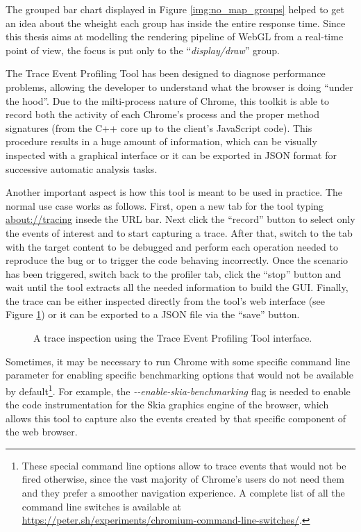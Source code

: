 The grouped bar chart displayed in Figure \ref{img:no_map_groups} helped to
get an idea about the wheight each group has inside the entire response time.
Since this thesis aims at modelling the rendering pipeline of WebGL from a real-time
point of view, the focus is put only to the ``\emph{display/draw}'' group.

The Trace Event Profiling Tool has been designed to diagnose performance problems,
allowing the developer to understand what the browser is doing ``under the hood''.
Due to the milti-process nature of Chrome, this toolkit is able to record
both the activity of each Chrome's process and the proper method signatures
(from the C++ core up to the client's JavaScript code). This procedure results in
a huge amount of information, which can be visually inspected with a graphical
interface or it can be exported in JSON format for successive automatic analysis
tasks.

Another important aspect is how this tool is meant to be used in practice. The normal use case
works as follows. First, open a new tab for the tool typing \url{about://tracing}
insede the URL bar.
Next click the ``record'' button to select only the events of interest and to
start capturing a trace. After that, switch to the tab with the target content
to be debugged and perform each operation needed to reproduce the bug or to trigger
the code behaving incorrectly. Once the scenario has been triggered, switch back to the profiler
tab, click the ``stop'' button and wait until the tool extracts all the needed
information to build the GUI. Finally, the trace can be either inspected directly
from the tool's web interface (see Figure \ref{img:chrome_profiler}) or it can be
exported to a JSON file via the ``save'' button.
\begin{figure}[!htb]
    \caption{A trace inspection using the Trace Event Profiling Tool interface.}
    \label{img:chrome_profiler}
\end{figure}

Sometimes, it may be necessary to run Chrome with some specific command
line parameter for enabling specific benchmarking options that would not be
available by default\footnote{These special command line options allow to trace
events that would not be fired otherwise, since the vast majority of Chrome's
users do not need them and they prefer a smoother navigation experience. A complete
list of all the command line switches is available at
\url{https://peter.sh/experiments/chromium-command-line-switches/}.}.
For example, the \emph{-{}-enable-skia-benchmarking} flag is needed to enable the
code instrumentation for the Skia graphics engine of the browser, which allows
this tool to capture also the events created by that specific
component of the web browser.


